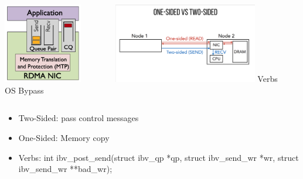 \documentclass[11pt]{beamer}                                                                                                   %
\begin{document}
\begin{frame}[t]
	
\begin{columns}
		\begin{column}{0.4\textwidth}
			\centering
			\includegraphics[height=3.5cm]{03.png}
			\\
			{OS Bypass}
		\end{column}
		\begin{column}{0.6\textwidth}
			\centering
			\includegraphics[height=3.5cm]{04.png}
			{Verbs}
		\end{column}
	\end{columns}

		\begin{itemize}
			\item Two-Sided: pass control messages
			\item One-Sided: Memory copy
			\item Verbs: int ibv\_post\_send(struct ibv\_qp *qp, struct ibv\_send\_wr *wr, struct ibv\_send\_wr **bad\_wr);
		\end{itemize}
\end{frame}
\end{document}
